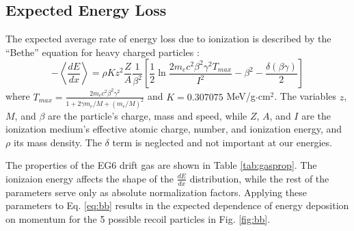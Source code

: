 \documentclass[amsmath,amssymb,notitlepage,12pt]{revtex4-1}
\begin{document}


\subsection{Expected Energy Loss}
The expected average rate of energy loss due to ionization is described by the ``Bethe'' equation for heavy charged particles \cite{pdg}:
\begin{equation}
    -\left\langle\frac{dE}{dx}\right\rangle = \rho Kz^2\frac{Z}{A}\frac{1}{\beta^2}\left[\frac{1}{2}\ln{\frac{2m_ec^2\beta^2\gamma^2T_{max}}{I^2}-\beta^2-\frac{\delta(\beta\gamma)}{2}}\right]
\label{eq:bb}
\end{equation}
where $T_{max} = \frac{2m_ec^2\beta^2\gamma^2}{1+2\gamma m_e/M+(m_e/M)^2}$ and $K=0.307075$ MeV/g$\cdot$cm$^2$.  The variables $z$, $M$, and $\beta$ are the particle's charge, mass and speed, while $Z$, $A$, and $I$ are the ionization medium's effective atomic charge, number, and ionization energy, and $\rho$ its mass density.  The $\delta$ term is neglected and not important at our energies.

The properties of the EG6 drift gas are shown in Table \ref{tab:gasprop}.  The ionizaion energy affects the shape of the $\frac{dE}{dx}$ distribution, while the rest of the parameters serve only as absolute normalization factors.  Applying these parameters to Eq. \ref{eq:bb} results in the expected dependence of energy deposition on momentum for the 5 possible recoil particles in Fig. \ref{fig:bb}.
\end{document}
